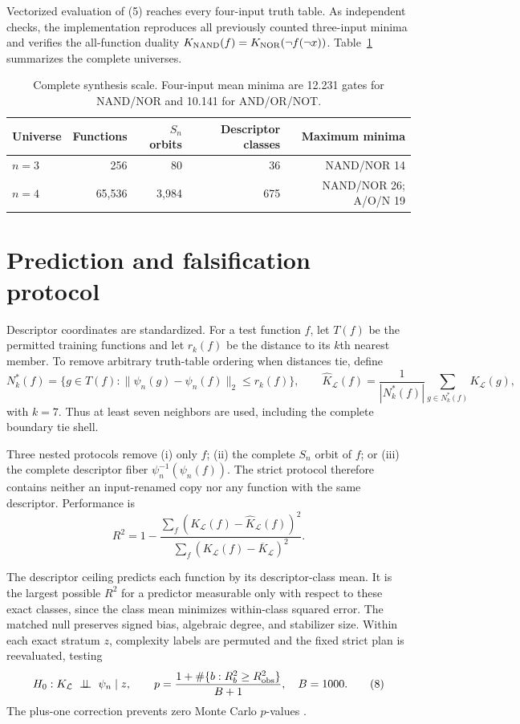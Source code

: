 \documentclass[10pt]{article}
\theoremstyle{definition}
\begin{document}
Vectorized evaluation of (5) reaches every four-input truth table.  As
independent checks, the implementation reproduces all previously counted
three-input minima and verifies the all-function duality
$K_{\rm NAND}(f)=K_{\rm NOR}(\neg f(\neg x))$.  Table~\ref{tab:scale}
summarizes the complete universes.

\begin{table}[!htbp]
\centering\small
\begin{tabular}{lrrrr}
\toprule
Universe & Functions & $S_n$ orbits & Descriptor classes & Maximum minima \\
\midrule
$n=3$ & 256 & 80 & 36 & NAND/NOR 14 \\
$n=4$ & 65,536 & 3,984 & 675 & NAND/NOR 26; A/O/N 19 \\
\bottomrule
\end{tabular}
\caption{Complete synthesis scale.  Four-input mean minima are 12.231 gates
for NAND/NOR and 10.141 for AND/OR/NOT.}
\label{tab:scale}
\end{table}

\section{Prediction and falsification protocol}

Descriptor coordinates are standardized.  For a test function $f$, let
$T(f)$ be the permitted training functions and let $r_k(f)$ be the distance to
its $k$th nearest member.  To remove arbitrary truth-table ordering when
distances tie, define
\[
 N_k^\ast(f)=\{g\in T(f):\|\psi_n(g)-\psi_n(f)\|_2\le r_k(f)\},
 \qquad
 \widehat K_{\mathcal L}(f)=\frac{1}{|N_k^\ast(f)|}
 \sum_{g\in N_k^\ast(f)}K_{\mathcal L}(g),
 \tag{6}
\]
with $k=7$.  Thus at least seven neighbors are used, including the complete
boundary tie shell.

Three nested protocols remove (i) only $f$; (ii) the complete $S_n$ orbit of
$f$; or (iii) the complete descriptor fiber
$\psi_n^{-1}(\psi_n(f))$.  The strict protocol therefore contains neither an
input-renamed copy nor any function with the same descriptor.  Performance is
\[
 R^2=1-\frac{\sum_f(K_{\mathcal L}(f)-\widehat K_{\mathcal L}(f))^2}
 {\sum_f(K_{\mathcal L}(f)-\overline K_{\mathcal L})^2}.
 \tag{7}
\]

The descriptor ceiling predicts each function by its descriptor-class mean.
It is the largest possible $R^2$ for a predictor measurable only with respect
to these exact classes, since the class mean minimizes within-class squared
error.  The matched null preserves signed bias, algebraic degree, and
stabilizer size.  Within each exact stratum $z$, complexity labels are
permuted and the fixed strict plan is reevaluated, testing
\[
 H_0:K_{\mathcal L}\ \perp\!\!\!\perp\ \psi_n\mid z,
 \qquad
 p=\frac{1+\#\{b:R_b^2\ge R_{\rm obs}^2\}}{B+1},\quad B=1000.
 \tag{8}
\]
The plus-one correction prevents zero Monte Carlo $p$-values
\cite{phipson2010}.
\end{document}
